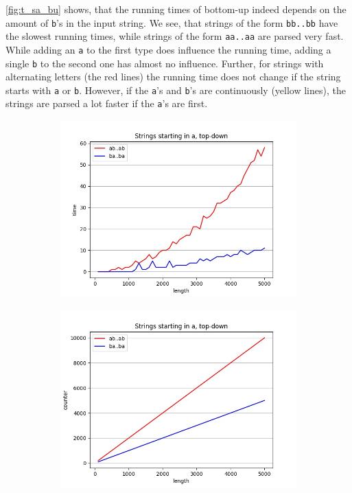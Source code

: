 \cref{fig:t_sa_bu} shows, that the running times of bottom-up indeed depends on the amount of \texttt{b}'s in the input string.
We see, that strings of the form \texttt{bb..bb} have the slowest running times, while strings of the form \texttt{aa..aa} are parsed very fast.
While adding an \texttt{a} to the first type does influence the running time, adding a single \texttt{b} to the second one has almost no influence.
Further, for strings with alternating letters (the red lines) the running time does not change if the string starts with \texttt{a} or \texttt{b}.
However, if the \texttt{a}'s and \texttt{b}'s are continuously (yellow lines), the strings are parsed a lot faster if the \texttt{a}'s are first.

\begin{figure}[!ht]
    \centering
    \begin{subfigure}[b]{0.48\textwidth}
        \includegraphics[width=1.1\textwidth]{Resources/t_sa_td.jpg}
        \caption{}
        \label{fig:t_sa_td}
    \end{subfigure}
    \hfill
    \begin{subfigure}[b]{0.48\textwidth}
        \centering
        \includegraphics[width=1.1\textwidth]{Resources/c_sa_td.jpg}

\end{subfigure}
\end{figure}
